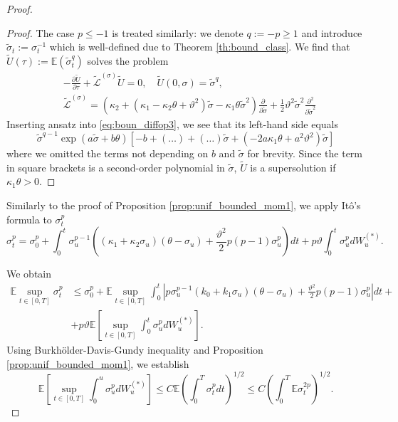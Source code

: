 \documentclass[11pt,a4paper] {article}
\begin{document}
\begin{proof}
\begin{proof}
The case $p\le -1$ is treated similarly: we denote $q:=-p\ge 1$ and introduce $\tilde\sigma_t:=\sigma_t^{-1}$ which is well-defined due to Theorem \ref{th:bound_class}. 
We find that 
$\tilde U(\tau):=\mathbb{E}(\tilde \sigma_t^q)$  solves the problem
\begin{equation}\label{eq:boun_diffop3}
\begin{split}
&-\frac{\partial \tilde U}{\partial \tau}+\tilde{\mathcal{L}}^{(\sigma)}\tilde U=0,\quad  \tilde U(0,\sigma)=\tilde\sigma^q,\\
&\tilde{\mathcal{L}}^{(\sigma)}=\left(\kappa_2+(\kappa_1-\kappa_2\theta+\vartheta^2)\tilde\sigma-\kappa_1\theta\tilde\sigma^2\right)\frac{\partial}{\partial \tilde\sigma}+\frac 12\vartheta^2\tilde\sigma^2\frac{\partial^2}{\partial \tilde\sigma^2}
\end{split}
\end{equation}
Inserting ansatz into \eqref{eq:boun_diffop3}, we see that its left-hand side equals
\begin{equation*}
\tilde\sigma^{q-1}\exp(a\tilde\sigma+b\theta)\left[-b+(\ldots)+(\ldots)\tilde\sigma+(-2a\kappa_1\theta+a^2\vartheta^2)\tilde\sigma\right]
\end{equation*}
where we omitted the terms not depending on $b$ and $\tilde\sigma$ for brevity. 
Since the term in square brackets is a second-order polynomial in $\tilde \sigma$, $ \tilde{U}$ is a supersolution if $\kappa_1\theta>0$. 
\end{proof}


Similarly to the proof of Proposition \ref{prop:unif_bounded_mom1}, we apply It\^{o}'s formula to $\sigma_t^p$
\begin{equation*}
\sigma_t^p=\sigma_0^p+\int_0^t\sigma_u^{p-1}\left((\kappa_1+\kappa_2\sigma_u)(\theta-\sigma_u) + \frac{\vartheta^2}{2}p(p-1)\sigma_u^p\right)dt+p\vartheta\int_0^t\sigma_u^{p}dW_u^{(*)}.
\end{equation*}

We obtain
\begin{equation*}
\begin{split}
\mathbb{E}\sup_{t\in[0,T]}\sigma_t^p %
& \le 
\sigma_0^p+\mathbb{E}\sup_{t\in[0,T]}\int_0^t\left|p\sigma_u^{p-1}(k_0+k_1\sigma_u)(\theta-\sigma_u)+\frac{\vartheta^2}{2}p(p-1)\sigma_u^p\right|dt+\\
&+p\vartheta\mathbb{E}\left[\sup_{t\in[0,T]}\int_0^t\sigma_u^pdW_u^{(*)}\right].
\end{split}
\end{equation*}
Using Burkh\"{o}lder-Davis-Gundy inequality and Proposition \ref{prop:unif_bounded_mom1}, we establish
\begin{equation*}
\mathbb{E}\left[\sup_{t\in[0,T]}\int_0^u\sigma_u^pdW_u^{(*)}\right]\le C\mathbb{E}\left(\int_0^T\sigma_t^pdt\right)^{1/2}\le
C\left(\int_0^T\mathbb{E}\sigma_t^{2p}\right)^{1/2}.
\end{equation*}

\end{proof}
\end{document}

